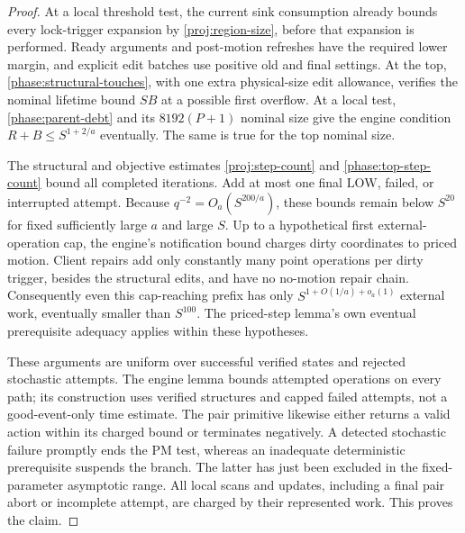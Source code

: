 \begin{proof}
At a local threshold test, the current sink consumption
already bounds every lock-trigger expansion by
\eqref{proj:region-size}, before that expansion is
performed.  Ready arguments and post-motion refreshes have
the required lower margin, and explicit edit batches use
positive old and final settings.
At the top, \eqref{phase:structural-touches}, with one
extra physical-size edit allowance, verifies the nominal
lifetime bound \(SB\) at a possible first overflow.
At a local test, \eqref{phase:parent-debt} and its
\(8192(P+1)\) nominal size give the engine condition
\(R+B\le S^{1+2/a}\) eventually.  The same is true for
the top nominal size.

The structural and objective estimates
\eqref{proj:step-count} and \eqref{phase:top-step-count}
bound all completed iterations.  Add at most one final
\(\mathrm{LOW}\), failed, or interrupted attempt.
Because \(q^{-2}=O_a(S^{200/a})\), these bounds remain
below \(S^{20}\) for fixed sufficiently large \(a\) and
large \(S\).
Up to a hypothetical first external-operation cap,
the engine's notification bound charges dirty coordinates
to priced motion.  Client repairs add only constantly
many point operations per dirty trigger, besides the
structural edits, and have no no-motion repair chain.
Consequently even this cap-reaching prefix has only
\(S^{1+O(1/a)+o_a(1)}\) external work, eventually smaller
than \(S^{100}\).  The priced-step lemma's own eventual
prerequisite adequacy applies within these hypotheses.

These arguments are uniform over successful verified
states and rejected stochastic attempts.  The engine
lemma bounds attempted operations on every path; its
construction uses verified structures and capped failed
attempts, not a good-event-only time estimate.
The pair primitive likewise either returns a valid
action within its charged bound or terminates negatively.
A detected stochastic failure promptly ends the PM test,
whereas an inadequate deterministic prerequisite suspends
the branch.  The latter has just been excluded in the
fixed-parameter asymptotic range.  All local scans and
updates, including a final pair abort or incomplete
attempt, are charged by their represented work.
This proves the claim.
\end{proof}

